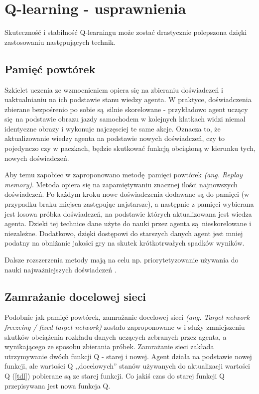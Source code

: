 \section{Q-learning - usprawnienia}\label{enhancements}
Skuteczność i stabilność Q-learningu może zostać drastycznie polepszona dzięki zastosowaniu następujących technik.

\subsection{Pamięć powtórek}\label{replaymemory}

Szkielet uczenia ze wzmocnieniem opiera się na zbieraniu doświadczeń i uaktualnianiu na ich podstawie stanu wiedzy agenta. W praktyce, doświadczenia zbierane bezpośrenio po sobie są silnie skorelowane - przykładowo agent uczący się na podstawie obrazu jazdy samochodem w kolejnych klatkach widzi niemal identyczne obrazy i wykonuje najczęsciej te same akcje. Oznacza to, że aktualizowanie wiedzy agenta na podstawie nowych doświadczeń, czy to pojedynczo czy w paczkach, będzie skutkować funkcją obciążoną w kierunku tych, nowych doświadczeń.

Aby temu zapobiec w \cite{mnih2015human} zaproponowano metodę pamięci powtórek \textit{(ang. Replay memory)}. Metoda opiera się na zapamiętywaniu znacznej ilości najnowszych doświadczeń. Po każdym kroku nowe doświadczenia dodawane są do pamięci (w przypadku braku miejsca zastępując najstarsze), a następnie z pamięci wybierana jest losowa próbka doświadczeń, na podstawie których aktualizowana jest wiedza agenta. Dzieki tej technice dane użyte do nauki przez agenta są nieskorelowane i niezależne. Dodatkowo, dzięki dostępowi do starszych danych agent jest mniej podatny na obniżanie jakości gry na skutek krótkotrwałych spadków wyników.

Dalsze rozszerzenia metody mają na celu np. priorytetyzowanie używania do nauki najważniejszych doświadczeń \cite{DBLP:journals/corr/SchaulQAS15}.
\subsection{Zamrażanie docelowej sieci}\label{fixedtarget}

Podobnie jak pamięć powtórek, zamrażanie docelowej sieci \textit{(ang. Target network freezeing / fixed target network)} zostało zaproponowane w \cite{mnih2015human} i służy zmniejszeniu skutków obciążenia rozkładu danych uczących zebranych przez agenta, a wynikającego ze sposobu zbierania próbek. Zamrażanie sieci zakłada utrzymywanie dwóch funkcji Q - starej i nowej. Agent działa na podstawie nowej funkcji, ale wartości Q ,,docelowych'' stanów używanych do aktualizacji wartości Q (\ref{tdl}) pobierane są ze starej funkcji. Co jakiś czas do starej funkcji Q przepisywana jest nowa funkcja Q.

